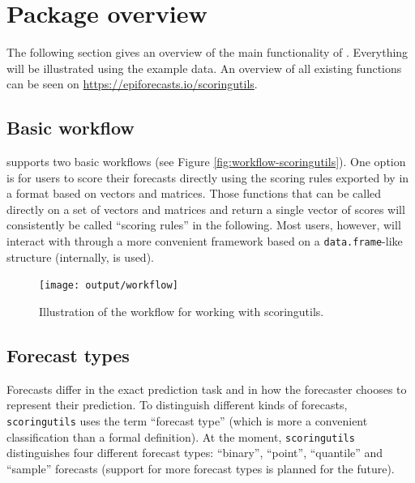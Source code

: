 \documentclass[
]{jss}
\begin{document}
\section{Package overview}\label{package-overview}

The following section gives an overview of the main functionality of
. Everything will be illustrated using the example
data. An overview of all existing functions can be seen on
\url{https://epiforecasts.io/scoringutils}.

\subsection{Basic workflow}\label{basic-workflow}

 supports two basic workflows (see Figure
\ref{fig:workflow-scoringutils}). One option is for users to score their
forecasts directly using the scoring rules exported by
 in a format based on vectors and matrices. Those
functions that can be called directly on a set of vectors and matrices
and return a single vector of scores will consistently be called
``scoring rules'' in the following. Most users, however, will interact
with  through a more convenient framework based on a
\texttt{data.frame}-like structure (internally, 
\citep{data.table} is used).

\begin{CodeChunk}
\begin{figure}[!h]

{\centering \texttt{[image: output/workflow]} 

}

\caption[Illustration of the workflow for working with scoringutils]{Illustration of the workflow for working with scoringutils.}\label{fig:workfklow-scoringutils}
\end{figure}
\end{CodeChunk}

\subsection{Forecast types}\label{forecast-types}

Forecasts differ in the exact prediction task and in how the forecaster
chooses to represent their prediction. To distinguish different kinds of
forecasts, \texttt{scoringutils} uses the term ``forecast type'' (which
is more a convenient classification than a formal definition). At the
moment, \texttt{scoringutils} distinguishes four different forecast
types: ``binary'', ``point'', ``quantile'' and ``sample'' forecasts
(support for more forecast types is planned for the future).
\end{document}
